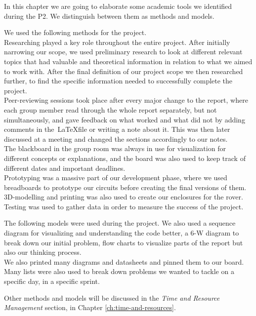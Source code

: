

In this chapter we are going to elaborate some academic tools we identified during the P2. We distinguish between them as methods and models. 


We used the following methods for the project.\\
Researching played a key role throughout the entire project. After initially narrowing our scope, we used preliminary research to look at different relevant topics that had valuable and theoretical information in relation to what we aimed to work with. After the final definition of our project scope we then researched further, to find the specific information needed to successfully complete the project. \\
Peer-reviewing sessions took place after every major change to the report, where each group member read through the whole report separately, but not simultaneously, and gave feedback on what worked and what did not by adding comments in the~\LaTeX file or writing a note about it. This was then later discussed at a meeting and changed the sections accordingly to our notes.\\
The blackboard in the group room was always in use for visualization for different concepts or explanations, and the board was also used to keep track of different dates and important deadlines.\\
Prototyping was a massive part of our development phase, where we used breadboards to prototype our circuits before creating the final versions of them. 3D-modelling and printing was also used to create our enclosures for the rover.\\
Testing was used to gather data in order to measure the success of the project.

The following models were used during the project. We also used a sequence diagram for visualizing and understanding the code better, a 6-W diagram to break down our initial problem, flow charts to visualize parts of the report but also our thinking process.\\
We also printed many diagrams and datasheets and pinned them to our board. Many lists were also used to break down problems we wanted to tackle on a specific day, in a specific sprint.

Other methods and models will be discussed in the \textit{Time and Resource Management} section, in Chapter \ref{ch:time-and-resources}.

